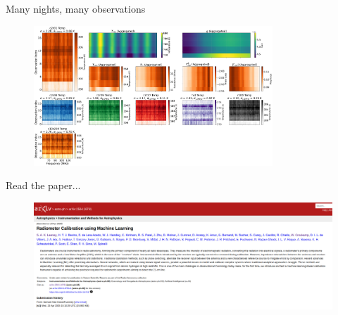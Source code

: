 \documentclass[aspectratio=169]{beamer}
\begin{document}
\begin{frame}{\small{Many nights, many observations}}
	\begin{figure}
		\centering
		\includegraphics[width=0.8\textwidth]{images/pasted_image_20250410111857.png}
	\end{figure}
\end{frame}

\begin{frame}{\small{Read the paper...}}
	\begin{figure}
		\centering
		\includegraphics[width=\textwidth]{images/paper_front.png}
	\end{figure}
\end{frame}
\end{document}
